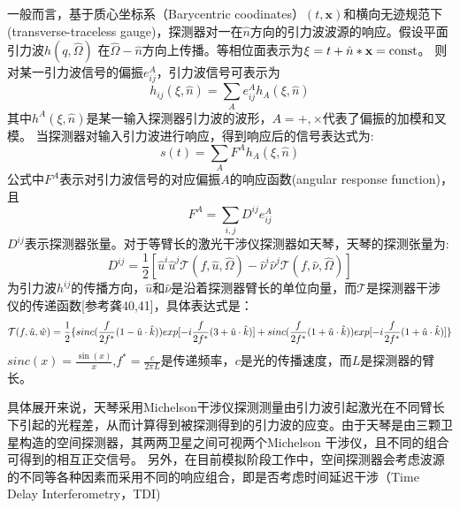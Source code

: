 一般而言，基于质心坐标系（Barycentric coodinates）$(t,\textbf{x})$和横向无迹规范下(transverse-traceless gauge)，探测器对一在$\hat{n}$方向的引力波波源的响应。假设平面引力波$h(q,\hat{\Omega})$ 在$\hat{\Omega}-\hat{n}$方向上传播。等相位面表示为$\mathcal{\xi}=t+\hat{n}*\textbf{x}=\rm const$。
则对某一引力波信号的偏振$e^A_{ij}$\cite{zhang2020full}，引力波信号可表示为
\begin{equation}
h_{ij}(\mathcal{\xi},\hat{n})=\sum_A e^A_{ij}h_A(\mathcal{\xi},\hat{n})
\end{equation}
其中$h^A(\mathcal{\xi},\hat{n})$是某一输入探测器引力波的波形，$A=+,\times$代表了偏振的加模和叉模。
当探测器对输入引力波进行响应，得到响应后的信号表达式为:$$s(t)=\sum_AF^Ah_A(\mathcal{\xi},\hat{n})$$
公式中$F^A$表示对引力波信号的对应偏振$A$的响应函数(angular response function)，且$$F^A = \sum_{i,j} D^{ij}e^A_{ij}$$
$D^{ij}$表示探测器张量。对于等臂长的激光干涉仪探测器如天琴，天琴的探测张量为:
\begin{equation}
D^{ij}=\frac{1}{2}[\hat{u}^i \hat{u}^j\mathcal{T}(f,\hat{u},\hat{\Omega})-\hat{\nu}^i\hat{\nu}^j\mathcal{T}(f,\hat{\nu},\hat{\Omega})]
\end{equation}
为引力波$h^{ij}$的传播方向，$\hat{u}$和$\hat{\nu}$是沿着探测器臂长的单位向量，而$\mathcal{T}$是探测器干涉仪的传递函数[参考龚40,41]，具体表达式是：
\begin{equation}
\mathcal{T}(f,\hat{u},\hat{w})=\frac{1}{2}\{ \\
sinc(\frac{f}{2f^*}(1-\hat{u}\cdot \hat{k}))exp[-i\frac{f}{2f^*}(3+\hat{u} \cdot  \hat{k})]  \\
+ sinc(\frac{f}{2f^*}(1+ \hat{u}\cdot \hat{k}))exp[-i\frac{f}{2f^*}(1+\hat{u} \cdot  \hat{k})] \\
\}
\end{equation}
$sinc(x)=\frac{\sin (x)}{x}$,$f^* =\frac{c}{2\pi L}$是传递频率，$c$是光的传播速度，而$L$是探测器的臂长。

具体展开来说，天琴采用Michelson干涉仪探测测量由引力波引起激光在不同臂长下引起的光程差，从而计算得到被探测得到的引力波的应变。由于天琴是由三颗卫星构造的空间探测器，其两两卫星之间可视两个Michelson 干涉仪\cite{luo2016tianqin}，且不同的组合可得到的相互正交信号。
另外，在目前模拟阶段工作中，空间探测器会考虑波源的不同等各种因素而采用不同的响应组合，即是否考虑时间延迟干涉（Time Delay Interferometry，TDI)%



